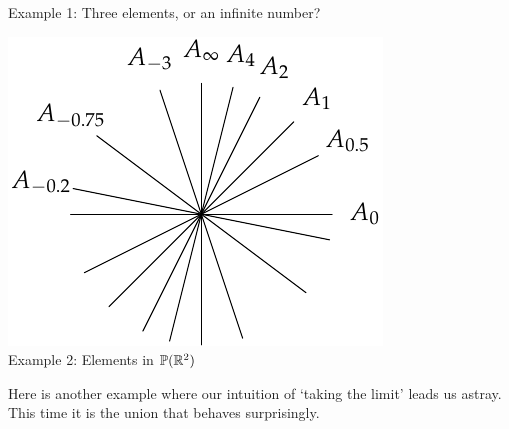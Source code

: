 \begin{center}
\begin{minipage}[b]{0.45\textwidth}
\centering
Example 1: Three elements, or an infinite number?
\end{minipage}\qquad\qquad
\begin{minipage}[b]{0.35\textwidth}
\centering
\includegraphics[width=\textwidth]{setsii-03-projective}\\
Example 2: Elements in $\mathbb P(\mathbb{R}^2)$
\end{minipage}
\end{center}



Here is another example where our intuition of `taking the limit' leads us astray. This time it is the union that behaves surprisingly.\par

